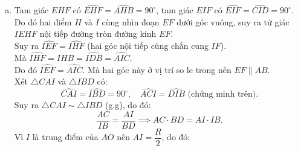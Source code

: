 \begin{bt}
{\begin{enumerate}[a)]
	Vì $H$ là hình chiếu của $I$ lên $CD$ nên $IH \perp CD \implies \widehat{CHI} = 90^\circ$.\\
	Hai đỉnh $A$ và $H$ kề nhau cùng nhìn đoạn $CI$ dưới góc $90^\circ$, suy ra tứ giác $ACHI$ nội tiếp đường tròn đường kính $CI$.\\
	Chứng minh tương tự: Vì $By \perp AB$ nên $\widehat{DBI} = 90^\circ$; và $\widehat{DHI} = 90^\circ$, do đó tứ giác $BDIH$ nội tiếp đường tròn đường kính $DI$.\\
	Từ tứ giác $ACHI$ nội tiếp, ta có $\widehat{AHI} = \widehat{ACI}$ (hai góc nội tiếp cùng chắn cung $AI$).\\
	Từ tứ giác $BDIH$ nội tiếp, ta có $\widehat{IHB} = \widehat{IDB}$ (hai góc nội tiếp cùng chắn cung $IB$).\\
	Do đó:
	$$\widehat{AHB} = \widehat{AHI} + \widehat{IHB} = \widehat{ACI} + \widehat{IDB}.$$
	Mặt khác, trong tam giác $CAI$ vuông tại $A$, ta có $\widehat{ACI} + \widehat{AIC} = 90^\circ$.\\
	Lại có $\widehat{AIC} + \widehat{CID} + \widehat{DIB} = 180^\circ \implies \widehat{AIC} + \widehat{DIB} = 180^\circ - 90^\circ = 90^\circ$.\\
	Suy ra $\widehat{ACI} = \widehat{DIB}$ (cùng phụ với $\widehat{AIC}$).\\
	Trong tam giác $DBI$ vuông tại $B$, ta có $\widehat{DIB} + \widehat{IDB} = 90^\circ \implies \widehat{ACI} + \widehat{IDB} = 90^\circ$.\\
	Vậy $\widehat{AHB} = 90^\circ$.
	\item Tam giác $EHF$ có $\widehat{EHF} = \widehat{AHB} = 90^\circ$, tam giác $EIF$ có $\widehat{EIF} = \widehat{CID} = 90^\circ$.\\
	Do đó hai điểm $H$ và $I$ cùng nhìn đoạn $EF$ dưới góc vuông, suy ra tứ giác $IEHF$ nội tiếp đường tròn đường kính $EF$.\\
	Suy ra $\widehat{IEF} = \widehat{IHF}$ (hai góc nội tiếp cùng chắn cung $IF$).\\
	Mà $\widehat{IHF} = \widehat{IHB} = \widehat{IDB} = \widehat{AIC}$.\\
	Do đó $\widehat{IEF} = \widehat{AIC}$. Mà hai góc này ở vị trí so le trong nên $EF \parallel AB$.\\
	Xét $\triangle CAI$ và $\triangle IBD$ có:
	$$\widehat{CAI} = \widehat{IBD} = 90^\circ,\quad \widehat{ACI} = \widehat{DIB}\text{ (chứng minh trên)}.$$
	Suy ra $\triangle CAI \sim \triangle IBD$ (g.g), do đó:
	$$\dfrac{AC}{IB} = \dfrac{AI}{BD} \implies AC \cdot BD = AI \cdot IB.$$
	Vì $I$ là trung điểm của $AO$ nên $AI = \dfrac{R}{2}$, do đó:

\end{enumerate}}
\end{bt}
